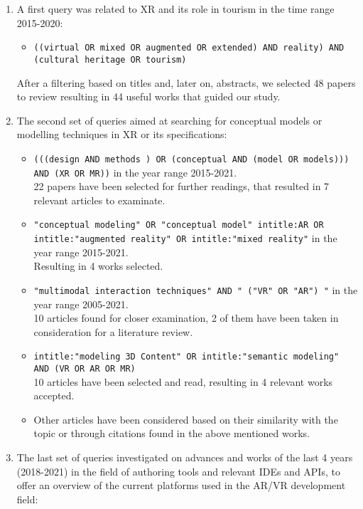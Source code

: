 \begin{enumerate}
    \item A first query was related to XR and its role in tourism in the time range 2015-2020:
        \begin{itemize}
            \item \texttt{((virtual OR mixed OR augmented OR extended) AND reality) AND (cultural heritage OR tourism)}
        \end{itemize}
        After a filtering based on titles and, later on, abstracts, we selected 48 papers to review resulting in 44 useful works that guided our study.
    \item The second set of queries aimed at searching for conceptual models or modelling techniques in XR or its specifications:
        \begin{itemize}
            \item \texttt{(((design  AND methods )  OR  (conceptual  AND  (model  OR  models))) AND (XR  OR  MR))} in the year range 2015-2021.\\
            22 papers have been selected for further readings, that resulted in 7 relevant articles to examinate.
            \item \texttt{"conceptual modeling" OR "conceptual model" intitle:AR OR intitle:"augmented reality" OR intitle:"mixed reality"} in the year range 2015-2021.\\
            Resulting in 4 works selected.
            \item \texttt{"multimodal interaction techniques" AND " ("VR" OR "AR") "} in the year range 2005-2021.\\
            10 articles found for closer examination, 2 of them have been taken in consideration for a literature review.
            \item \texttt{intitle:"modeling 3D Content" OR  intitle:"semantic modeling" AND (VR OR AR OR MR)}\\
            10 articles have been selected and read, resulting in 4 relevant works accepted.
            \item Other articles have been considered based on their similarity with the topic or through citations found in the above mentioned works.
        \end{itemize}
    \item The last set of queries investigated on advances and works of the last 4 years (2018-2021) in the field of authoring tools and relevant IDEs and APIs, to offer an overview of the current platforms used in the AR/VR development field:

\end{enumerate}
